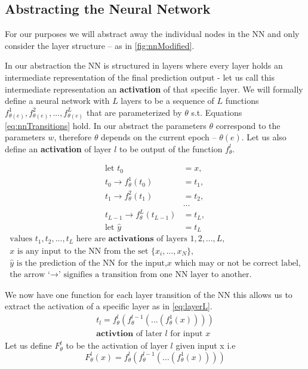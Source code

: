\documentclass[dissertation.tex]{subfiles}
\begin{document}
\subsection{Abstracting the Neural Network}
For our purposes we will abstract away the individual nodes in the NN and only
consider the layer structure -- as in \autoref{fig:nnModified}.

In our abstraction the NN is structured in layers where every layer holds
an intermediate representation of the final prediction output - let us call this
intermediate representation an \textbf{activation} of that specific layer.
We will formally define a neural network with $L$ layers to be a sequence of $L$
functions $f_{\theta(e)}^1,f_{\theta(e)}^2,...,f_{\theta(e)}^L$ that are
parameterized by $\theta$ s.t. Equations \ref{eq:nnTransitions} hold.
In our abstract the parameters $\theta$ correspond to the parameters $w$,
therefore $\theta$ depends on the current epoch -- $\theta(e)$.
Let us also define an \textbf{activation} of layer $l$ to be output of the
function $f_\theta^l$.

\vbox{
\begin{align}
	\text{let } t_0 &= x, \nonumber \\
  t_0 \rightarrow f_{\theta}^1(t_0) &= t_1, \nonumber \\
  t_1 \rightarrow f_{\theta}^2(t_1) &= t_2, \nonumber \\
  &... \nonumber \\
  t_{L-1} \rightarrow f_{\theta}^L(t_{L-1}) &= t_L, \nonumber\\
  \text{let } \hat{y} &= t_L \label{eq:nnTransitions}
\end{align}
\vspace*{-\baselineskip}
\vspace*{-\baselineskip}
\begin{gather}
  \text{values } t_1,t_2,...,t_L 
  \text{ here are } \textbf{activations } \text{of layers } 1,2,...,L,
	\nonumber\\
	x \text{ is any input to the NN from the set } \{x_i,...,x_N\}, \nonumber\\
	\hat{y} \text{ is the prediction of the NN for the input,} x
	\text{ which may or not be correct label,} \nonumber\\
	\text{the arrow `}\rightarrow\text{' signifies a transition from one NN layer to another.}
	\nonumber
\end{gather}
}

We now have one function for each layer transition of the NN this
allows us to extract the activation of a specific layer as in
\autoref{eq:layerL}.
\begin{gather}
  t_l = f_{\theta}^l(f_{\theta}^{l-1}(...(f_{\theta}^1(x))))
  \label{eq:layerL} \\
  \textbf{activtion}\text{ of later }l\text{ for input }x \nonumber
\end{gather}
Let us define $F_\theta^t$ to be the activation of layer $l$ given input x
i.e
\begin{equation}
  F_{\theta}^l(x) = f_{\theta}^l(f_{\theta}^{l-1}(...(f_{\theta}^1(x))))
  \label{eq:bigF}
\end{equation}
\end{document}
